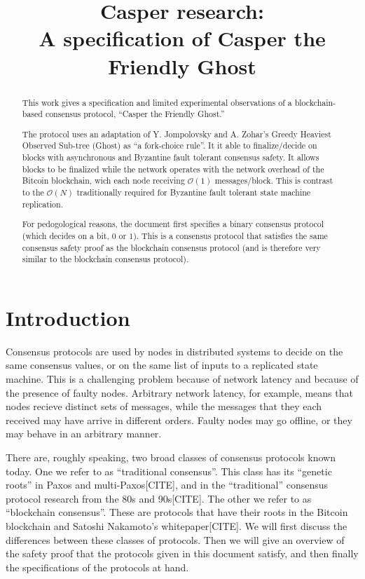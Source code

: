 \documentclass{article}
\theoremstyle{definition}
\begin{document}
\title{Casper research: \\ A specification of Casper the Friendly Ghost}
\maketitle

\begin{abstract}
This work gives a specification and limited experimental observations of a blockchain-based consensus protocol, ``Casper the Friendly Ghost.'' 

The protocol uses an adaptation of Y. Jompolovsky and A. Zohar's Greedy Heaviest Observed Sub-tree (Ghost) as ``a fork-choice rule''. It it able to finalize/decide on blocks with asynchronous and Byzantine fault tolerant consensus safety. It allows blocks to be finalized while the network operates with the network overhead of the Bitcoin blockchain, wich each node receiving $\mathcal{O}(1)$ messages/block. This is contrast to the $\mathcal{O}(N)$ traditionally required for Byzantine fault tolerant state machine replication.

For pedogological reasons, the document first specifies a binary consensus protocol (which decides on a bit, $0$ or $1$). This is a consensus protocol that satisfies the same consensus safety proof as the blockchain consensus protocol (and is therefore very similar to the blockchain consensus protocol). 
\end{abstract}

\section{Introduction}

Consensus protocols are used by nodes in distributed systems to decide on the same consensus values, or on the same list of inputs to a replicated state machine. This is a challenging problem because of network latency and because of the presence of faulty nodes. Arbitrary network latency, for example, means that nodes recieve distinct sets of messages, while the messages that they each received may have arrive in different orders. Faulty nodes may go offline, or they may behave in an arbitrary manner. 

There are, roughly speaking, two broad classes of consensus protocols known today. One we refer to as ``traditional consensus''. This class has its ``genetic roots'' in Paxos and multi-Paxos[CITE], and in the ``traditional'' consensus protocol research from the 80s and 90s[CITE]. The other we refer to as ``blockchain consensus''. These are protocols that have their roots in the Bitcoin blockchain and Satoshi Nakamoto's whitepaper[CITE]. We will first discuss the differences between these classes of protocols. Then we will give an overview of the safety proof that the protocols given in this document satisfy, and then finally the specifications of the protocols at hand.
\end{document}
